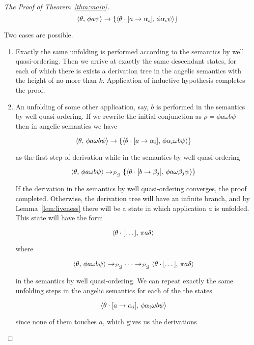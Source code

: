 \begin{proof}[The Proof of Theorem~\ref{thm:main}]
  \[
  \langle \theta,\,\phi a \psi \rangle \to \{\langle \theta\cdot[a\to\alpha_i],\,\phi\alpha_i\psi \rangle\}
  \]

  Two cases are possible.

  \begin{enumerate}
    
  \item Exactly the same unfolding is performed according to the semantics by well quasi-ordering. Then we arrive at
    exactly the same descendant states, for each of which there is exists a derivation tree in the angelic semantics
    with the height of no more than $k$. Application of inductive hypothesis completes the proof.
    
  \item An unfolding of some other application, say, $b$ is performed in the semantics by well quasi-ordering. If we
    rewrite the initial conjunction as $\rho=\phi a \omega b \psi$ then in angelic semantics we have

    \[
    \langle \theta,\,\phi a \omega b\psi \rangle\to\{\langle \theta\cdot[a\to\alpha_i],\,\phi \alpha_i \omega b\psi \rangle\}
    \]

    as the first step of derivation while in the semantics by well quasi-ordering

    \[
    \langle \theta,\,\phi a \omega b\psi \rangle\to_{\mathcal{P}_\trianglelefteq}\{\langle \theta\cdot[b\to\beta_j],\,\phi a \omega \beta_j\psi \rangle\}
    \]

    If the derivation in the semantics by well quasi-ordering converges, the proof completed. Otherwise, the derivation
    tree will have an infinite branch, and by Lemma~\ref{lem:liveness} there will be a state in which
    application $a$ is unfolded. This state will have the form

    \[
    \langle \theta\cdot[\dots],\,\pi a \delta \rangle
    \]

    where 

    \[
    \langle \theta,\,\phi a \omega b\psi \rangle\to_{\mathcal{P}_\trianglelefteq}\dots\to_{\mathcal{P}_\trianglelefteq}\langle \theta\cdot[\dots],\,\pi a \delta \rangle
    \]

    in the semantics by well quasi-ordering. We can repeat exactly the same unfolding steps in the
    angelic semantics for each of the the states

    \[
    \langle \theta\cdot[a\to\alpha_i],\,\phi \alpha_i \omega b\psi \rangle
    \]

    since none of them touches $a$, which gives us the derivations


\end{enumerate}
\end{proof}
